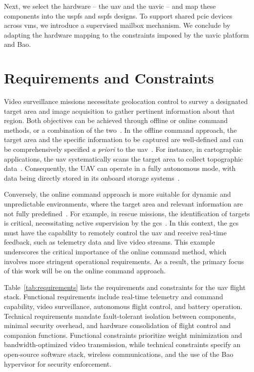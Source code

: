Next, we select the hardware -- the \gls{uav} and the \gls{uavic} -- and map
these components into the \gls{uspfs} and \gls{sspfs} designs. To support shared
\gls{pcie} devices across \glspl{vm}, we introduce a supervised mailbox
mechanism. We conclude by adapting the hardware mapping to the constraints
imposed by the \gls{uavic} platform and Bao.

\section{Requirements and Constraints}
\label{sec:req-sec}
Video surveillance missions necessitate geolocation control to survey a
designated target area and image acquisition to gather pertinent information
about that region. Both objectives can be achieved through offline or online
command methods, or a combination of the two~\cite{gugan2023path}.
%
In the offline command approach, the target area and the specific information to
be captured are well-defined and can be comprehensively specified \emph{a
priori} to the \gls{uav}~\cite{gugan2023path}. For instance, in cartographic
applications, the \gls{uav} systematically scans the target area to collect
topographic data~\cite{caroti_uav-borne_2017}. Consequently,
the UAV can operate in a fully autonomous mode, with data being directly stored
in its onboard storage systems~\cite{qgc-survey}.

Conversely, the online command approach is more suitable for dynamic and
unpredictable environments, where the target area and relevant information are
not fully predefined~\cite{gugan2023path}. For example, in rescue missions, the identification of
targets is critical, necessitating active supervision by the \gls{gcs}~\cite{mohsan2022towards}. In this
context, the \gls{gcs} must have the capability to remotely control the
\gls{uav} and receive real-time feedback, such as telemetry data and live video
streams.
%
This example underscores the critical importance of the online command method,
which involves more stringent operational requirements. As a result, the primary
focus of this work will be on the online command approach.

Table~\ref{tab:requirements} lists the requirements and constraints for the
\gls{uav} flight stack. Functional requirements include real-time telemetry and
command capability, video surveillance, autonomous flight control, and battery
operation. Technical requirements mandate fault-tolerant isolation between
components, minimal security overhead, and hardware consolidation of flight
control and companion functions. Functional constraints prioritize weight
minimization and bandwidth-optimized video transmission, while technical
constraints specify an open-source software stack, wireless communications,
and the use of the Bao hypervisor for security enforcement.

